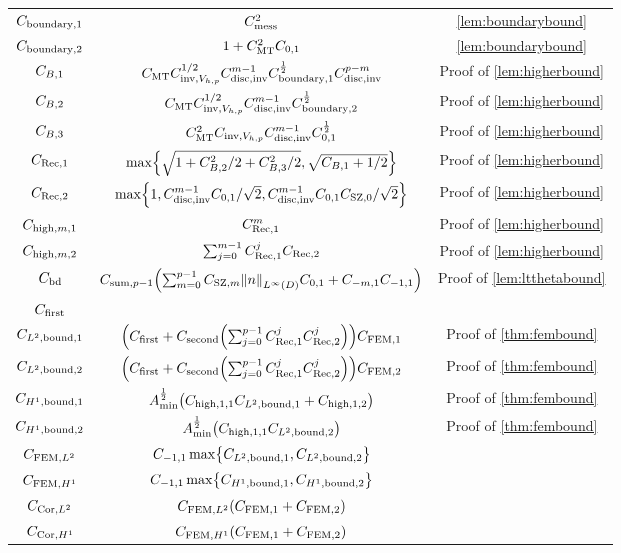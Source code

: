 \begin{longtabu}{ccc}
  $C_{\mathrm{boundary},1}$ & $C_{\mathrm{mess}}^2$ & \cref{lem:boundarybound} \\
  $C_{\mathrm{boundary},2}$ & $1 + C_{\mathrm{MT}}^2 C_{0,1}$ & \cref{lem:boundarybound}\\
  $C_{B,1}$&$C_{\mathrm{MT}} C_{\mathrm{inv},V_{h,p}}^{1/2} C_{\mathrm{disc},\mathrm{inv}}^{m-1} C_{\mathrm{boundary},1}^{\frac{1}{2}} C_{\mathrm{disc},\mathrm{inv}}^{p-m}$&Proof of \cref{lem:higherbound}\\
  $C_{B,2}$&$C_{\mathrm{MT}} C_{\mathrm{inv},V_{h,p}}^{1/2} C_{\mathrm{disc},\mathrm{inv}}^{m-1} C_{\mathrm{boundary},2}^{\frac{1}{2}}$&Proof of \cref{lem:higherbound}\\
  $C_{B,3}$&$C_{\mathrm{MT}}^2 C_{\mathrm{inv},V_{h,p}} C_{\mathrm{disc},\mathrm{inv}}^{m-1}C_{0,1}^{\frac{1}{2}}$&Proof of \cref{lem:higherbound}\\
  $C_{\mathrm{Rec},1}$&$\max\set{\sqrt{1 + \CBt^2/2 + \CBth^2/2},\sqrt{\CBo + 1/2}}$&Proof of \cref{lem:higherbound}\\
  $C_{\mathrm{Rec},2}$&$\max\set{1,\Chinv^{m-1}\Cfn{0,1}/\sqrt{2},\Chinv^{m-1}\Cfn{0,1}\CSZfn{0}/\sqrt{2}}$&Proof of \cref{lem:higherbound}\\
  $C_{\mathrm{high},m,1}$ & $C_{\mathrm{Rec},1}^m$&Proof of \cref{lem:higherbound}\\
  $C_{\mathrm{high},m,2}$ &$\sum_{j=0}^{m-1} C_{\mathrm{Rec},1}^j C_{\mathrm{Rec},2}$&Proof of \cref{lem:higherbound}\\
  $C_{\mathrm{bd}}$ &$\Csumfn{p-1}\mleft(\sum_{m=0}^{p-1} \CSZfn{m} \NLiD{n}\Cfn{0,1} + \Cfn{-m,1}\Cfn{-1,1}\mright)$&Proof of \cref{lem:ltthetabound}\\
  $C_{\mathrm{first}}$ &&\\
  $C_{L^{2},\mathrm{bound},1}$&$\mleft(\Cfirst+ \Csecond \mleft(\sum_{j=0}^{p-1} \CReco^j \CRect^j\mright)\mright) \CFEMotilde$&Proof of \cref{thm:fembound}\\
  $C_{L^{2},\mathrm{bound},2}$&$\mleft(\Cfirst+ \Csecond \mleft(\sum_{j=0}^{p-1} \CReco^j \CRect^j\mright)\mright)\CFEMttilde$&Proof of \cref{thm:fembound}\\
  $C_{H^{1},\mathrm{bound},1}$&$\Amin^{\half} \mleft(\Chighfn{1,1}\CLtboundo + \Chighfn{1,2}\mright)$&Proof of \cref{thm:fembound}\\
  $C_{H^{1},\mathrm{bound},2}$&$\Amin^{\half} \mleft(\Chighfn{1,1}\CLtboundt\mright)$&Proof of \cref{thm:fembound}\\
  $C_{\mathrm{FEM},L^{2}}$&$\Cfn{-1,1} \max\set{\CLtboundo,\CLtboundt}$&\\
  $C_{\mathrm{FEM},H^{1}}$&$ \Cfn{-1,1}\max\set{\CHoboundo,\CHoboundt}$&\\
  $C_{\mathrm{Cor},L^{2}}$&$\CFEMLt\mleft(\CFEMo+\CFEMt\mright)$&\\
  $C_{\mathrm{Cor},H^{1}}$&$\CFEMHo\mleft(\CFEMotilde+\CFEMttilde\mright)$&\\
\bottomrule
\end{longtabu}
